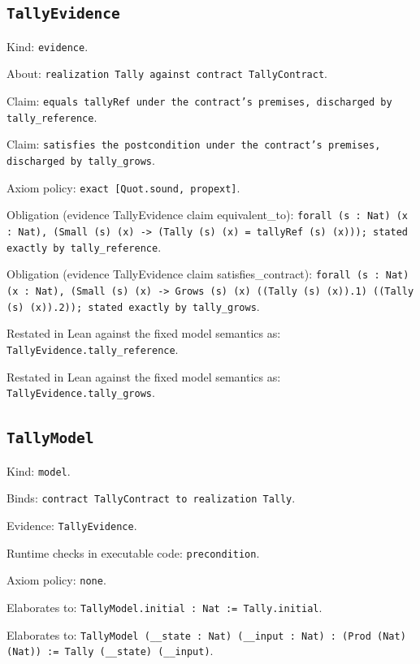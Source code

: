 \documentclass[11pt]{article}
\begin{document}
\subsection*{\texttt{TallyEvidence}}
\noindent Kind: \texttt{evidence}.\par
\noindent About: \texttt{realization Tally against contract TallyContract}.\par
\noindent Claim: \texttt{equals tallyRef under the contract's premises, discharged by tally\_reference}.\par
\noindent Claim: \texttt{satisfies the postcondition under the contract's premises, discharged by tally\_grows}.\par
\noindent Axiom policy: \texttt{exact [Quot.sound, propext]}.\par
\noindent Obligation (evidence TallyEvidence claim equivalent\_to): \texttt{forall (s : Nat) (x : Nat), (Small (s) (x) -> (Tally (s) (x) = tallyRef (s) (x))); stated exactly by tally\_reference}.\par
\noindent Obligation (evidence TallyEvidence claim satisfies\_contract): \texttt{forall (s : Nat) (x : Nat), (Small (s) (x) -> Grows (s) (x) ((Tally (s) (x)).1) ((Tally (s) (x)).2)); stated exactly by tally\_grows}.\par
\noindent Restated in Lean against the fixed model semantics as: \texttt{TallyEvidence.tally\_reference}.\par
\noindent Restated in Lean against the fixed model semantics as: \texttt{TallyEvidence.tally\_grows}.\par
\subsection*{\texttt{TallyModel}}
\noindent Kind: \texttt{model}.\par
\noindent Binds: \texttt{contract TallyContract to realization Tally}.\par
\noindent Evidence: \texttt{TallyEvidence}.\par
\noindent Runtime checks in executable code: \texttt{precondition}.\par
\noindent Axiom policy: \texttt{none}.\par
\noindent Elaborates to: \texttt{TallyModel.initial : Nat := Tally.initial}.\par
\noindent Elaborates to: \texttt{TallyModel (\_\_state : Nat) (\_\_input : Nat) : (Prod (Nat) (Nat)) := Tally (\_\_state) (\_\_input)}.\par
\end{document}
